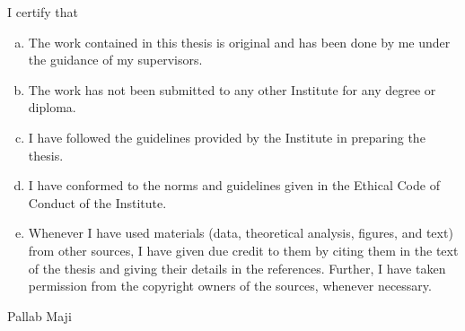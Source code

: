 \begin{declaration}

I certify that
\vspace{1cm}
\begin{enumerate}[(a)]
	\item The work contained in this thesis is original and has been done by me under the guidance of my supervisors.
	\item The work has not been submitted to any other Institute for any degree or diploma.
	\item I have followed the guidelines provided by the Institute in preparing the thesis.
	\item I have conformed to the norms and guidelines given in the Ethical Code of Conduct of the Institute.
	\item Whenever I have used materials (data, theoretical analysis, figures, and text) from other sources, I have given due credit to them by citing them in the text of the thesis and giving their details in the references. Further, I have taken permission from the copyright owners of the sources, whenever necessary.
\end{enumerate}

\vspace{1cm}
\begin{flushright}
	\large Pallab Maji\\
	\ %
\end{flushright}

\end{declaration}